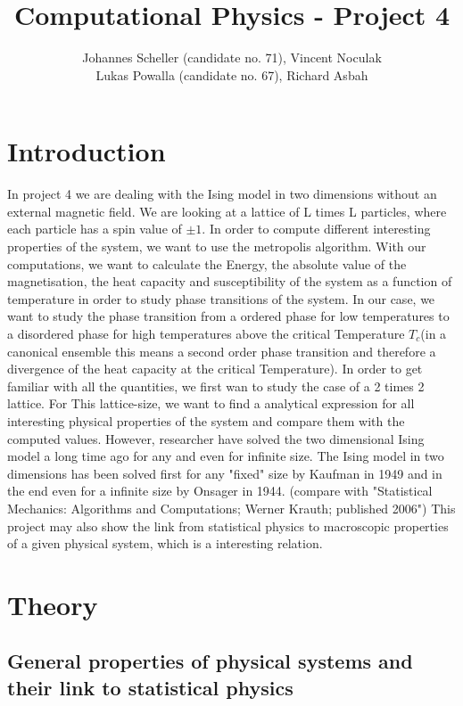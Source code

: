 \documentclass[10pt,a4paper]{article}
\author{Johannes Scheller (candidate no. 71), Vincent Noculak\\ Lukas Powalla (candidate no. 67), Richard Asbah}
\title{Computational Physics - Project 4}
\begin{document}
\maketitle
\newpage
\tableofcontents
\newpage

\section*{Introduction}
In project 4 we are dealing with the Ising model in two dimensions without an external magnetic field. We are looking at a lattice of L times L particles, where each particle has a spin value of $\pm 1$. In order to compute different interesting properties of the system, we want to use the metropolis algorithm.  With our computations, we want to calculate the Energy, the absolute value of the magnetisation, the heat capacity and susceptibility of the system as a function of temperature in order to study phase transitions of the system. 
In our case, we want to study the phase transition from a ordered phase for low temperatures to a disordered phase for high temperatures above the critical Temperature $T_c$(in a canonical ensemble this means a second order phase transition and therefore a divergence of the heat capacity at the critical Temperature).
In order to get familiar with all the quantities, we first wan to study the case of a 2 times 2 lattice. For This lattice-size, we want to find a analytical expression for all interesting physical properties of the system and compare them with the computed values.
However, researcher have solved the two dimensional Ising model a long time ago for any and even for infinite size.
The Ising model in two dimensions has been solved first for any "fixed" size by Kaufman in 1949 and in the end even for a infinite size by Onsager in 1944.  (compare with "Statistical Mechanics: Algorithms and Computations; Werner Krauth; published 2006")
This project may also show the link from statistical physics to macroscopic properties of a given physical system, which is a interesting relation.
\section{Theory}

\subsection{General properties of physical systems and their link to statistical physics}
\end{document}
